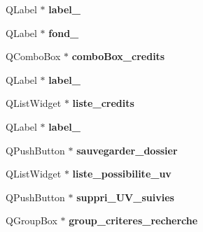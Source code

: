\begin{DoxyCompactItemize}
\item 
\hypertarget{class_ui__mondossier_a4853b51405e4cbd04f24ca7968bd3cfe}{Q\+Label $\ast$ {\bfseries label\+\_}}\label{class_ui__mondossier_a4853b51405e4cbd04f24ca7968bd3cfe}

\item 
\hypertarget{class_ui__mondossier_ab9026c3809ebbbdcbb01b16d367da7e7}{Q\+Label $\ast$ {\bfseries fond\+\_}}\label{class_ui__mondossier_ab9026c3809ebbbdcbb01b16d367da7e7}

\item 
\hypertarget{class_ui__mondossier_a060f8e38bdb16356e45f32510693354e}{Q\+Combo\+Box $\ast$ {\bfseries combo\+Box\+\_\+credits}}\label{class_ui__mondossier_a060f8e38bdb16356e45f32510693354e}

\item 
\hypertarget{class_ui__mondossier_aa2c9e9bd25ed083408c358b7627ec4d3}{Q\+Label $\ast$ {\bfseries label\+\_}}\label{class_ui__mondossier_aa2c9e9bd25ed083408c358b7627ec4d3}

\item 
\hypertarget{class_ui__mondossier_ae8a13b3e99f7b2b339a1e4195afae94b}{Q\+List\+Widget $\ast$ {\bfseries liste\+\_\+credits}}\label{class_ui__mondossier_ae8a13b3e99f7b2b339a1e4195afae94b}

\item 
\hypertarget{class_ui__mondossier_a6e0abf8fc339d893b961ffa030b2d46b}{Q\+Label $\ast$ {\bfseries label\+\_}}\label{class_ui__mondossier_a6e0abf8fc339d893b961ffa030b2d46b}

\item 
\hypertarget{class_ui__mondossier_a6e9b5a3a69a10dcc81cc07882c089cba}{Q\+Push\+Button $\ast$ {\bfseries sauvegarder\+\_\+dossier}}\label{class_ui__mondossier_a6e9b5a3a69a10dcc81cc07882c089cba}

\item 
\hypertarget{class_ui__mondossier_aa7d3bed0a7ca1700679e1ccc65c60834}{Q\+List\+Widget $\ast$ {\bfseries liste\+\_\+possibilite\+\_\+uv}}\label{class_ui__mondossier_aa7d3bed0a7ca1700679e1ccc65c60834}

\item 
\hypertarget{class_ui__mondossier_acbdd8bcb6fbb11c11d3d9a135db4e2e5}{Q\+Push\+Button $\ast$ {\bfseries suppri\+\_\+\+U\+V\+\_\+suivies}}\label{class_ui__mondossier_acbdd8bcb6fbb11c11d3d9a135db4e2e5}

\item 
\hypertarget{class_ui__mondossier_a02348ae35448e8b6e509a9cc87cf2dae}{Q\+Group\+Box $\ast$ {\bfseries group\+\_\+criteres\+\_\+recherche}}\label{class_ui__mondossier_a02348ae35448e8b6e509a9cc87cf2dae}


\end{DoxyCompactItemize}
